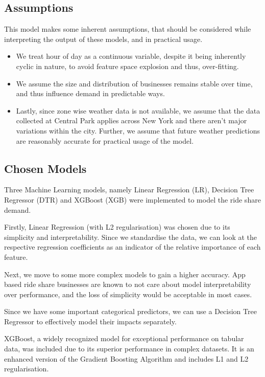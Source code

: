 \documentclass[11pt]{article}
\begin{document}
\subsection{Assumptions}
This model makes some inherent assumptions, that should be considered while interpreting the output of these models, and in practical usage.
\begin{itemize} 
    \item We treat hour of day as a continuous variable, despite it being inherently cyclic in nature, to avoid feature space explosion and thus, over-fitting.
    \item We assume the size and distribution of businesses remains stable over time, and thus influence demand in predictable ways.
    \item Lastly, since zone wise weather data is not available, we assume that the data collected at Central Park applies across New York and there aren’t major variations within the city. Further, we assume that future weather predictions are reasonably accurate for practical usage of the model.
\end{itemize}
\subsection{Chosen Models}
Three Machine Learning models, namely Linear Regression (LR), Decision Tree Regressor (DTR) and XGBoost (XGB) were implemented to model the ride share demand.

Firstly, Linear Regression (with L2 regularisation) was chosen due to its simplicity and interpretability. Since we standardise the data, we can look at the respective regression coefficients as an indicator of the relative importance of each feature.

Next, we move to some more complex models to gain a higher accuracy. App based ride share businesses are known to not care about model interpretability over performance, and the loss of simplicity would be acceptable in most cases.

Since we have some important categorical predictors, we can use a Decision Tree Regressor to effectively model their impacts separately.

XGBoost, a widely recognized model for exceptional performance on tabular data, was included due to its superior performance in complex datasets\cite{xgboost}. It is an enhanced version of the Gradient Boosting Algorithm and includes L1 and L2 regularisation\cite{xgboost}.
\end{document}

